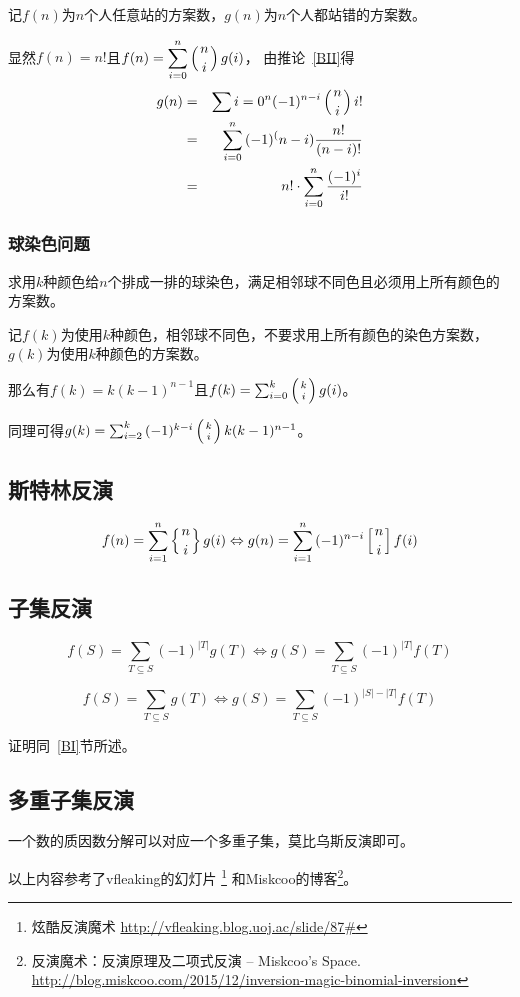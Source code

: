 记$f(n)$为$n$个人任意站的方案数，$g(n)$为$n$个人都站错的方案数。

显然$f(n)=n!$且$\displaystyle f(n)=\sum_{i=0}^n{\left(n \atop i\right) g(i)}$，
由推论~\ref{BII}得
\begin{eqnarray*}
	g(n)&=&\sum{i=0}^n{(-1)^{n-i}\left(n \atop i\right)i!}\\
	&=&\sum_{i=0}^n{(-1)^(n-i)\frac{n!}{(n-i)!}}\\
	&=&n!\cdot\sum_{i=0}^n{\frac{(-1)^i}{i!}}
\end{eqnarray*}
\subsubsection{球染色问题}
求用$k$种颜色给$n$个排成一排的球染色，满足相邻球不同色且必须用上所有颜色的方案数。

记$f(k)$为使用$k$种颜色，相邻球不同色，不要求用上所有颜色的染色方案数，
$g(k)$为使用$k$种颜色的方案数。

那么有$f(k)=k(k-1)^{n-1}$且$f(k)=\sum_{i=0}^k{\left(k \atop i\right)g(i)}$。

同理可得$g(k)=\sum_{i=2}^k{(-1)^{k-i}\left(k \atop i\right)k(k-1)^{n-1}}$。

\subsection{斯特林反演}
\begin{theorem}
    \begin{displaymath}
        f(n)=\sum_{i=1}^n{\left\{n \atop i\right\}g(i)}
        \Leftrightarrow
        g(n)=\sum_{i=1}^n{(-1)^{n-i}\left[n \atop i\right]f(i)}
    \end{displaymath}
\end{theorem}
\subsection{子集反演}
\begin{theorem}
	\begin{displaymath}
		f(S)=\sum_{T\subseteq S}{(-1)^{|T|}g(T)}
		\Leftrightarrow
		g(S)=\sum_{T\subseteq S}{(-1)^{|T|}f(T)}
	\end{displaymath}
\end{theorem}
\begin{inference}
	\begin{displaymath}
		f(S)=\sum_{T\subseteq S}{g(T)}
		\Leftrightarrow
		g(S)=\sum_{T\subseteq S}{(-1)^{|S|-|T|}f(T)}
	\end{displaymath}
\end{inference}
证明同~\ref{BI}节所述。
\subsection{多重子集反演}
一个数的质因数分解可以对应一个多重子集，莫比乌斯反演即可。

以上内容参考了vfleaking的幻灯片
\footnote{炫酷反演魔术 \url{http://vfleaking.blog.uoj.ac/slide/87\#}}
和Miskcoo的博客\footnote{反演魔术：反演原理及二项式反演 – Miskcoo's Space.
	\url{http://blog.miskcoo.com/2015/12/inversion-magic-binomial-inversion}
}。
